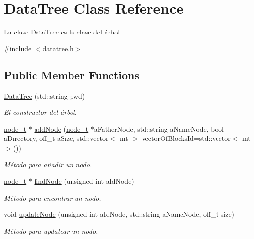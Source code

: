 \hypertarget{classDataTree}{}\section{Data\+Tree Class Reference}
\label{classDataTree}


La clase \hyperlink{classDataTree}{Data\+Tree} es la clase del árbol.  




{\ttfamily \#include $<$datatree.\+h$>$}

\subsection*{Public Member Functions}
\begin{DoxyCompactItemize}
\item 
\hyperlink{classDataTree_ad15b4598b9fe62c07ac85ef08e9f0d3e}{Data\+Tree} (std\+::string pwd)
\begin{DoxyCompactList}\small\item\em El constructor del árbol. \end{DoxyCompactList}\item 
\hyperlink{structnode__t}{node\+\_\+t} $\ast$ \hyperlink{classDataTree_aac6f58c8502bae9254bcb476798c23fb}{add\+Node} (\hyperlink{structnode__t}{node\+\_\+t} $\ast$a\+Father\+Node, std\+::string a\+Name\+Node, bool a\+Directory, off\+\_\+t a\+Size, std\+::vector$<$ int $>$ vector\+Of\+Blocks\+Id=std\+::vector$<$ int $>$())
\begin{DoxyCompactList}\small\item\em Método para añadir un nodo. \end{DoxyCompactList}\item 
\hyperlink{structnode__t}{node\+\_\+t} $\ast$ \hyperlink{classDataTree_a657b8a8c425792549233eeb6fff18e16}{find\+Node} (unsigned int a\+Id\+Node)
\begin{DoxyCompactList}\small\item\em Método para encontrar un nodo. \end{DoxyCompactList}\item 
void \hyperlink{classDataTree_a8b38e906b287a8968d910bd3c9d1c9ce}{update\+Node} (unsigned int a\+Id\+Node, std\+::string a\+Name\+Node, off\+\_\+t size)
\begin{DoxyCompactList}\small\item\em Método para updatear un nodo. \end{DoxyCompactList}\item 

\end{DoxyCompactItemize}
